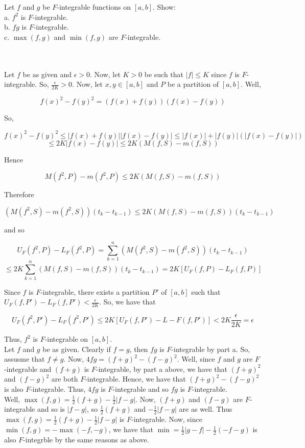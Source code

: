 Let $f$ and $g$ be $F$-integrable functions on $[a,b]$. Show:\\

a. $f^2$ is $F$-integrable.\\

b. $fg$ is $F$-integrable.\\

c. $\max(f,g)$ and $\min(f,g)$ are $F$-integrable.\\\\

\begin{solution}\renewcommand{\qedsymbol}{}\ \\
    Let $f$ be as given and $\epsilon>0$. Now, let $K>0$ be such that $|f|\leq K$ since $f$ is
    $F$-integrable. So, $\frac{\epsilon}{2K}>0$. Now, let $x,y\in[a,b]$ and $P$ be a partition of
    $[a,b]$. Well,
    
    $$f(x)^2-f(y)^2=(f(x)+f(y))(f(x)-f(y))$$
    
    So,
    
    $$f(x)^2-f(y)^2\leq|f(x)+f(y)||f(x)-f(y)|\leq|f(x)|+|f(y)|(|f(x)-f(y)|)$$
    $$\leq2K|f(x)-f(y)|\leq2K(M(f,S)-m(f,S))$$
    
    Hence
    
    $$M(f^2,P)-m(f^2,P)\leq 2K(M(f,S)-m(f,S))$$
    
    Therefore
    
    $$(M(f^2,S)-m(f^2,S))(t_k-t_{k-1})\leq2K(M(f,S)-m(f,S))(t_k-t_{k-1})$$
    
    and so
    
    $$U_F(f^2,P)-L_F(f^2,P)=\sum_{k=1}^n(M(f^2,S)-m(f^2,S))(t_k-t_{k-1})$$
    $$\leq2K\sum_{k=1}^n(M(f,S)-m(f,S))(t_k-t_{k-1})=2K[U_F(f,P)-L_F(f,P)]$$
    
    Since $f$ is $F$-integrable, there exists a partition $P'$ of $[a,b]$ such that
    $U_F(f,P')-L_F(f,P')<\frac{\epsilon}{2K}$. So, we have that
    
    $$U_F(f^2,P')-L_F(f^2,P')\leq2K[U_F(f,P')-L-F(f,P')]<2K\frac{\epsilon}{2K}=\epsilon$$
    
    
    Thus, $f^2$ is $F$-integrable on $[a,b]$.\\
    
    Let $f$ and $g$ be as given. Clearly if $f=g$, then $fg$ is $F$-integrable by part a. So, assusme
    that $f\neq g$. Now, $4fg=(f+g)^2-(f-g)^2$. Well, since $f$ and $g$ are $F$-integrable and $(f+g)$
    is $F$-integrable, by part a above, we have that $(f+g)^2$ and $(f-g)^2$ are both $F$-integrable.
    Hence, we have that $(f+g)^2-(f-g)^2$ is also $F$-integrable. Thus, $4fg$ is $F$-integrable and so
    $fg$ is $F$-integrable.\\

    Well, $\max(f,g)=\frac12(f+g)-\frac12|f-g|$. Now, $(f+g)$ and $(f-g)$ are $F$-integrable and so is
    $|f-g|$, so $\frac12(f+g)$ and $-\frac12|f-g|$ are as well. Thus
    $\max(f,g)=\frac12(f+g)-\frac12|f-g|$ is $F$-integrable. Now, since $\min(f,g)=-\max(-f,-g)$, we
    have that $\min=\frac12|g-f|-\frac12(-f-g)$ is also $F$-integrble by the same reasons as above.

\end{solution}